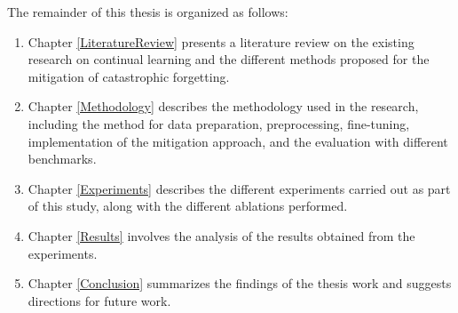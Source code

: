 The remainder of this thesis is organized as follows:
\begin{enumerate}
    \item Chapter \ref{LiteratureReview} presents a literature review on the existing research on continual learning and the different methods proposed for the mitigation of catastrophic forgetting.
    \item Chapter \ref{Methodology} describes the methodology used in the research, including the method for data preparation, preprocessing, fine-tuning, implementation of the mitigation approach, and the evaluation with different benchmarks.
    \item Chapter \ref{Experiments} describes the different experiments carried out as part of this study, along with the different ablations performed.
    \item Chapter \ref{Results} involves the analysis of the results obtained from the experiments.
    \item Chapter \ref{Conclusion} summarizes the findings of the thesis work and suggests directions for future work.

\end{enumerate}